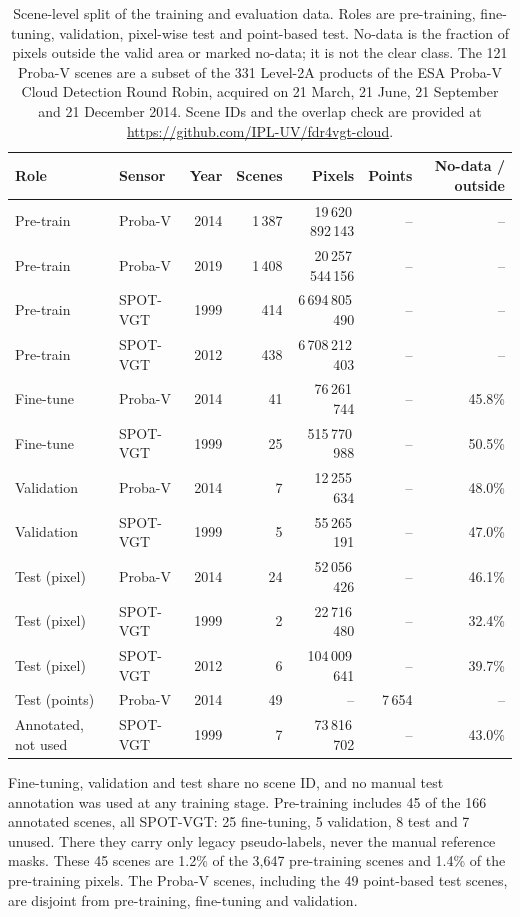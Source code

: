 \begin{table}[h]
\centering
\caption{Scene-level split of the training and evaluation data. Roles are pre-training, fine-tuning, validation, pixel-wise test and point-based test. No-data is the fraction of pixels outside the valid area or marked no-data; it is not the clear class. The 121 Proba-V scenes are a subset of the 331 Level-2A products of the ESA Proba-V Cloud Detection Round Robin, acquired on 21 March, 21 June, 21 September and 21 December 2014. Scene IDs and the overlap check are provided at \protect\url{https://github.com/IPL-UV/fdr4vgt-cloud}.}
\label{tab:splits}
\small
\setlength{\tabcolsep}{4pt}
\begin{tabular}{llrrrrr}
\hline
Role & Sensor & Year & Scenes & Pixels & Points & No-data / outside \\
\hline
Pre-train & Proba-V & 2014 & 1\,387 & 19\,620\,892\,143 & -- & -- \\
Pre-train & Proba-V & 2019 & 1\,408 & 20\,257\,544\,156 & -- & -- \\
Pre-train & SPOT-VGT & 1999 & 414 & 6\,694\,805\,490 & -- & -- \\
Pre-train & SPOT-VGT & 2012 & 438 & 6\,708\,212\,403 & -- & -- \\
Fine-tune & Proba-V & 2014 & 41 & 76\,261\,744 & -- & 45.8\% \\
Fine-tune & SPOT-VGT & 1999 & 25 & 515\,770\,988 & -- & 50.5\% \\
Validation & Proba-V & 2014 & 7 & 12\,255\,634 & -- & 48.0\% \\
Validation & SPOT-VGT & 1999 & 5 & 55\,265\,191 & -- & 47.0\% \\
Test (pixel) & Proba-V & 2014 & 24 & 52\,056\,426 & -- & 46.1\% \\
Test (pixel) & SPOT-VGT & 1999 & 2 & 22\,716\,480 & -- & 32.4\% \\
Test (pixel) & SPOT-VGT & 2012 & 6 & 104\,009\,641 & -- & 39.7\% \\
Test (points) & Proba-V & 2014 & 49 & -- & 7\,654 & -- \\
Annotated, not used & SPOT-VGT & 1999 & 7 & 73\,816\,702 & -- & 43.0\% \\
\hline
\end{tabular}
\end{table}

\begin{flushleft}
\small
Fine-tuning, validation and test share no scene ID, and no manual test annotation was used at any training stage. Pre-training includes 45 of the 166 annotated scenes, all SPOT-VGT: 25 fine-tuning, 5 validation, 8 test and 7 unused. There they carry only legacy pseudo-labels, never the manual reference masks. These 45 scenes are 1.2\% of the 3,647 pre-training scenes and 1.4\% of the pre-training pixels. The Proba-V scenes, including the 49 point-based test scenes, are disjoint from pre-training, fine-tuning and validation.
\end{flushleft}
